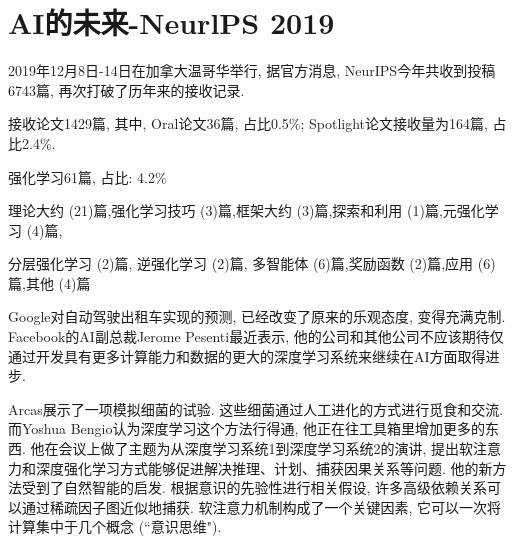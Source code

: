 \section{AI的未来-NeurlPS 2019}

2019年12月8日-14日在加拿大温哥华举行, 据官方消息, NeurIPS今年共收到投稿6743篇, 再次打破了历年来的接收记录.

接收论文1429篇, 其中, Oral论文36篇, 占比0.5\%; Spotlight论文接收量为164篇, 占比2.4\%.

强化学习61篇, 占比: 4.2\%

理论大约 (21)篇,强化学习技巧 (3)篇,框架大约 (3)篇,探索和利用 (1)篇,元强化学习 (4)篇,

分层强化学习 (2)篇, 逆强化学习 (2)篇, 多智能体 (6)篇,奖励函数 (2)篇,应用 (6)篇,其他 (4)篇

Google对自动驾驶出租车实现的预测, 已经改变了原来的乐观态度, 变得充满克制.
Facebook的AI副总裁Jerome Pesenti最近表示, 他的公司和其他公司不应该期待仅通过开发具有更多计算能力和数据的更大的深度学习系统来继续在AI方面取得进步.

Arcas展示了一项模拟细菌的试验. 这些细菌通过人工进化的方式进行觅食和交流.
而Yoshua Bengio认为深度学习这个方法行得通, 他正在往工具箱里增加更多的东西.
他在会议上做了主题为从深度学习系统1到深度学习系统2的演讲, 提出软注意力和深度强化学习方式能够促进解决推理、计划、捕获因果关系等问题.
他的新方法受到了自然智能的启发. 根据意识的先验性进行相关假设, 许多高级依赖关系可以通过稀疏因子图近似地捕获. 软注意力机制构成了一个关键因素, 它可以一次将计算集中于几个概念 (``意识思维").


